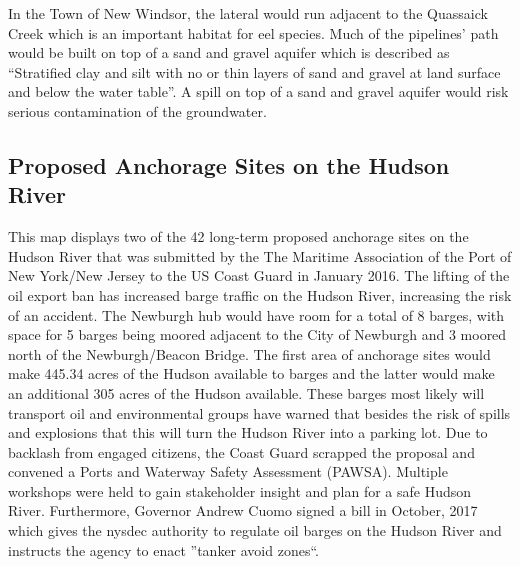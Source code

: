 In the Town of New Windsor, the lateral would run adjacent to the Quassaick 
Creek which is an important habitat for eel species. Much of the pipelines’ path 
would be built on top of a sand and gravel aquifer which is described as 
“Stratified clay and silt with no or thin layers of sand and gravel at land 
surface and below the water table”. A spill on top of a sand and gravel aquifer 
would risk serious contamination of the groundwater.

\subsection{Proposed Anchorage Sites on the Hudson 
River}\label{subsec:anchorages}
\label{map:proposedanchorages}
This map displays two of the 42 long-term proposed anchorage sites on the Hudson 
River that was submitted by the The Maritime Association of the Port of New 
York/New Jersey to the US Coast Guard in January 2016. The lifting of the oil 
export ban has increased barge traffic on the Hudson River, increasing the risk 
of an accident. The Newburgh hub would have room for a total of 8 barges, with 
space for 5 barges being moored adjacent to the City of Newburgh and 3 moored 
north of the Newburgh/Beacon Bridge. The first area of anchorage sites would 
make 445.34 acres of the Hudson available to barges and the latter would make an 
additional 305 acres of the Hudson available. These barges most likely will 
transport oil and environmental groups have warned that besides the risk of 
spills and explosions that this will turn the Hudson River into a parking lot. 
Due to backlash from engaged citizens, the Coast Guard scrapped the proposal and 
convened a Ports and Waterway Safety Assessment (PAWSA). Multiple workshops were 
held to gain stakeholder insight and plan for a safe Hudson River. Furthermore, 
Governor Andrew Cuomo signed a bill in October, 2017 which gives the 
\gls{nysdec} authority to regulate oil barges on the Hudson River and instructs 
the agency to enact ''tanker avoid zones``.
